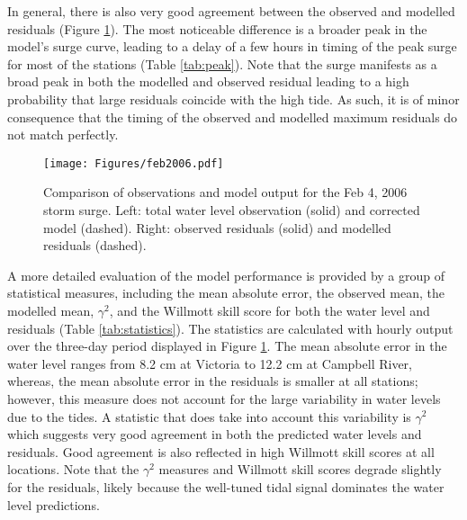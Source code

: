 \documentclass[letterpaper]{tATO2e}
\begin{document}
In general, there is also very good agreement between the observed and modelled residuals (Figure \ref{fig:feb2006}). {\color{red} The most noticeable difference is a broader peak in the model's surge curve, leading to a delay of a few hours in timing of the peak surge for most of the stations (Table \ref{tab:peak}). Note that the surge manifests as a broad peak in both the modelled and observed residual leading to a high probability that large residuals coincide with the high tide.} As such, it is of minor consequence that the timing of the observed and modelled maximum residuals do not match perfectly. 

\begin{figure}
\centering
\texttt{[image: Figures/feb2006.pdf]}
\caption{Comparison of observations and model output for the Feb 4, 2006 storm surge. Left: total water level observation (solid) and corrected model (dashed). Right: observed residuals (solid) and modelled residuals (dashed).}
\label{fig:feb2006}
\end{figure}

A more detailed evaluation of the model performance is provided by a group of statistical measures, including the mean absolute error, the observed mean, the modelled mean, $\gamma^2$, and the Willmott skill score for both the water level and residuals (Table \ref{tab:statistics}). The statistics are calculated with hourly output over the three-day period displayed in Figure \ref{fig:feb2006}. The mean absolute error in the water level ranges from {\color{red}8.2 cm} at Victoria to {\color{red}12.2} cm at Campbell River, whereas, the mean absolute error in the residuals is smaller at all stations; however, this measure does not account for the large variability in water levels due to the tides. A statistic that does take into account this variability is $\gamma^2$ which suggests very good agreement in both the predicted water levels and residuals. Good agreement is also reflected in high Willmott skill scores at all locations. Note that the $\gamma^2$ measures and Willmott skill scores degrade slightly for the residuals, likely because the well-tuned tidal signal dominates the water level predictions.
\end{document}
